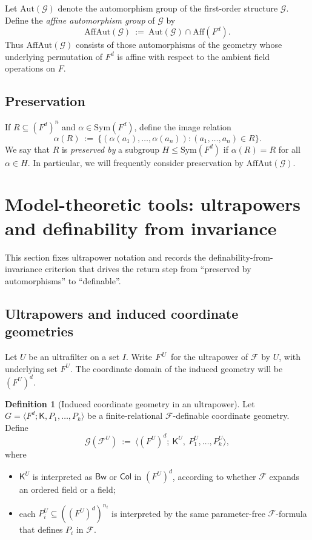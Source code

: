 \documentclass[11pt,a4paper]{article}
\newcommand{\G}{\mathcal{G}}
\newcommand{\F}{\mathcal{F}}
\theoremstyle{definition}
\newtheorem{definition}[theorem]{Definition}
\begin{document}
Let $\mathrm{Aut}(\G)$ denote the automorphism group of the first-order
structure $\G$. Define the \emph{affine automorphism group} of $\G$
by \[
\mathrm{AffAut}(\G)\ :=\ \mathrm{Aut}(\G)\cap \mathrm{Aff}(F^d).
\] Thus $\mathrm{AffAut}(\G)$ consists of those automorphisms of the
geometry whose underlying permutation of $F^d$ is affine with respect
to the ambient field operations on $F$.

\subsection{Preservation}
\label{sec:2.6}

If $R\subseteq (F^d)^n$ and $\alpha\in \mathrm{Sym}(F^d)$, define
the image relation \[
\alpha(R)\ :=\ \{(\alpha(a_1),\dots,\alpha(a_n)):(a_1,\dots,a_n)\in R\}.
\] We say that $R$ is \emph{preserved by} a subgroup
$H\le \mathrm{Sym}(F^d)$ if $\alpha(R)=R$ for all $\alpha\in H$.
In particular, we will frequently consider preservation by
$\mathrm{AffAut}(\G)$.

\section{Model-theoretic tools: ultrapowers and definability from invariance}
\label{sec:3}

This section fixes ultrapower notation and records the
definability-from-invariance criterion that drives the return step from
``preserved by automorphisms'' to ``definable''.

\subsection{Ultrapowers and induced coordinate geometries}
\label{sec:3.1}

Let $U$ be an ultrafilter on a set $I$. Write $\mathcal \F^U$ for
the ultrapower of $\F$ by $U$, with underlying set $F^U$.
The coordinate domain of the induced geometry will be $(F^U)^d$.

\begin{definition}[Induced coordinate geometry in an ultrapower]
	\label{def:3.1}
Let $G=\langle F^d;\mathsf K,P_1,\dots,P_k\rangle$ be a
finite-relational $\F$-definable coordinate geometry. Define
\[
\G(\F^U)\ :=\ \langle (F^U)^d;\ \mathsf K^U,\ P_1^U,\dots,P_k^U\rangle,
\] where
\begin{itemize}[leftmargin=2em]
\item $\mathsf K^U$ is interpreted as $\mathsf{Bw}$ or
$\mathsf{Col}$ in $(F^U)^d$, according to whether $\F$
expands an ordered field or a field;
\item each $P_i^U\subseteq ((F^U)^d)^{n_i}$ is interpreted by the same
parameter-free $\F$-formula that defines $P_i$ in
$\F$.
\end{itemize}
\end{definition}
\end{document}
